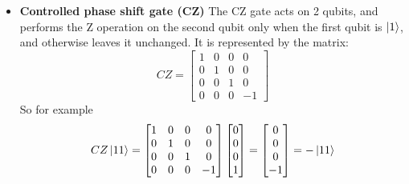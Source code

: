 \documentclass[main.tex]{subfiles}
\begin{document}
\begin{itemize}
	\item \textbf{Controlled phase shift gate (CZ)} The CZ gate acts on 2 qubits, 
	and performs the Z operation on the second qubit only when the first qubit is $\ket{1}$, and 
	otherwise leaves it unchanged. It is represented by the matrix:
	\begin{equation}
	CZ=
	\begin{bmatrix}
	1 & 0 & 0 & 0\\
	0 & 1 & 0 & 0\\
	0 & 0 & 1 & 0\\
	0 & 0 & 0 & -1
	\end{bmatrix}
	\end{equation}
	So for example
	$$
	CZ\ket{11}=
	\begin{bmatrix}
	1 & 0 & 0 & 0\\
	0 & 1 & 0 & 0\\
	0 & 0 & 1 & 0\\
	0 & 0 & 0 & -1
	\end{bmatrix}
	\begin{bmatrix}
	0 \\
	0 \\
	0 \\
	1
	\end{bmatrix}
	= 
	\begin{bmatrix}
	0 \\
	0 \\
	0 \\
	-1
	\end{bmatrix}
	=
	-\ket{11}
	$$\\
	

\end{itemize}
\end{document}

